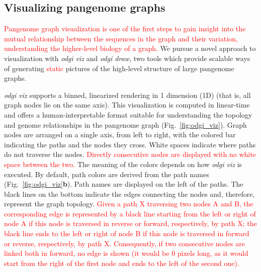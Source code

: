 \documentclass{bioinfo}
\newcommand{\REVIEWED}[1]{{\textcolor{Red}{#1}}}
\begin{document}
\subsection{Visualizing pangenome graphs}
\label{sec:viz}


\REVIEWED{Pangenome graph visualization is one of the first steps to gain insight into the mutual relationship between the sequences in the graph and their variation, understanding the higher-level biology of a graph.}
We pursue a novel approach to visualization with \textit{odgi viz} and \textit{odgi draw}, two tools which provide scalable ways of generating \REVIEWED{static} pictures of the high-level structure of large pangenome graphs.

\textit{odgi viz} supports a binned, linearized rendering in 1 dimension (1D) (that is, all graph nodes lie on the same axis).
This visualization is computed in linear-time and offers a human-interpretable format suitable for understanding the topology and genome relationships in the pangenome graph (Fig.~\ref{fig:odgi_viz}).
Graph nodes are arranged on a single axis, from left to right, with the colored bar indicating the paths and the nodes they cross.
White spaces indicate where paths do not traverse the nodes.
\REVIEWED{Directly consecutive nodes are displayed with no white space between the two.}
The meaning of the colors depends on how \textit{odgi viz} is executed.
By default, path colors are derived from the path names (Fig.~\ref{fig:odgi_viz}\textbf{b}).
Path names are displayed on the left of the paths.
The black lines on the bottom indicate the edges connecting the nodes and, therefore, represent the graph topology.
\REVIEWED{Given a path X traversing two nodes A and B, the corresponding edge is represented by a black line starting from the left or right of node A if this node is traversed in reverse or forward, respectively, by path X;
the black line ends to the left or right of node B if this node is traversed in forward or reverse, respectively, by path X.
Consequently, if two consecutive nodes are linked both in forward, no edge is shown (it would be 0 pixels long, as it would start from the right of the first node and ends to the left of the second one).}
\end{document}
